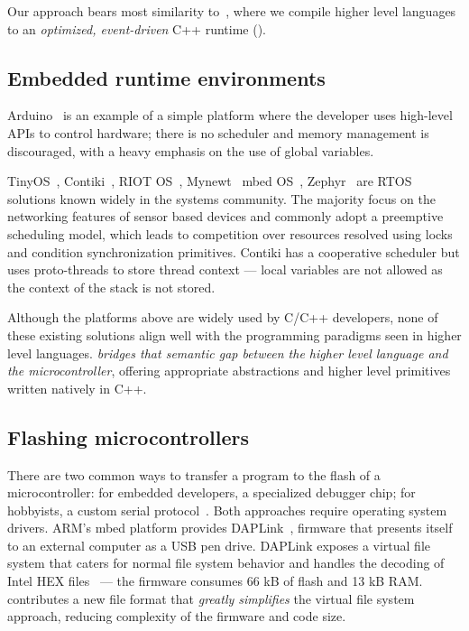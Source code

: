Our approach bears most similarity to~\cite{varma2004java}, where we compile higher level languages to an \emph{optimized, event-driven} C++ runtime (\CON).

\subsection{Embedded runtime environments}


Arduino~\cite{buildingArduino2014} is an example of a simple platform where the developer uses high-level APIs to control hardware; there is no scheduler and memory management is discouraged, with a heavy emphasis on 
the use of global variables.

TinyOS~\cite{levis2005tinyos}, Contiki~\cite{dunkels2012contiki}, RIOT OS~\cite{baccelli2013riot}, Mynewt~\cite{ApacheMy53:online} mbed OS~\cite{ARMmbed}, Zephyr~\cite{HomeZeph63:online} are RTOS solutions known widely in the systems community. The majority focus on the networking features of sensor based devices and commonly adopt a preemptive scheduling model, which leads to competition over resources resolved using locks and condition synchronization primitives. Contiki has a cooperative scheduler but uses proto-threads to store thread context --- local variables are not allowed as the context of the stack is not stored.

Although the platforms above are widely used by C/C++ developers, none of these existing solutions align well with the programming paradigms seen in higher level languages. \CO \emph{bridges that semantic gap between the higher level language and the microcontroller}, offering appropriate abstractions and higher level primitives written natively in C++.

\subsection{Flashing microcontrollers}

There are two common ways to transfer a program to the flash of a microcontroller: for embedded developers, a specialized debugger chip; for hobbyists, a custom serial protocol~\cite{AVRDUDEA15:online}. Both approaches require operating system drivers. ARM's mbed platform provides DAPLink~\cite{GitHubAR5:online}, firmware that presents itself to an external computer as a USB pen drive. DAPLink exposes a virtual file system that caters for normal file system behavior and handles the decoding of Intel HEX files~\cite{IntelHEX} --- the firmware consumes 66 kB of flash and 13 kB RAM. \UF contributes a new file format that \emph{greatly simplifies} the virtual file system approach, reducing complexity of the firmware and code size.

